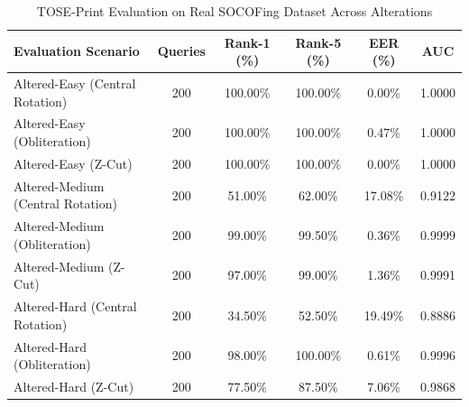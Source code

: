 \begin{table}[t]
\centering
\caption{TOSE-Print Evaluation on Real SOCOFing Dataset Across Alterations}
\label{tab:socofing_real}
\begin{tabular}{lccccc}
\hline
Evaluation Scenario & Queries & Rank-1 (\%) & Rank-5 (\%) & EER (\%) & AUC \\
\hline
Altered-Easy (Central Rotation) & 200 & 100.00\% & 100.00\% & 0.00\% & 1.0000 \\
Altered-Easy (Obliteration) & 200 & 100.00\% & 100.00\% & 0.47\% & 1.0000 \\
Altered-Easy (Z-Cut) & 200 & 100.00\% & 100.00\% & 0.00\% & 1.0000 \\
Altered-Medium (Central Rotation) & 200 & 51.00\% & 62.00\% & 17.08\% & 0.9122 \\
Altered-Medium (Obliteration) & 200 & 99.00\% & 99.50\% & 0.36\% & 0.9999 \\
Altered-Medium (Z-Cut) & 200 & 97.00\% & 99.00\% & 1.36\% & 0.9991 \\
Altered-Hard (Central Rotation) & 200 & 34.50\% & 52.50\% & 19.49\% & 0.8886 \\
Altered-Hard (Obliteration) & 200 & 98.00\% & 100.00\% & 0.61\% & 0.9996 \\
Altered-Hard (Z-Cut) & 200 & 77.50\% & 87.50\% & 7.06\% & 0.9868 \\
\hline
\end{tabular}
\end{table}
